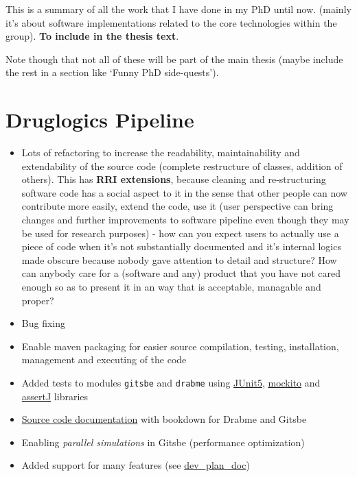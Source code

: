 \documentclass[
  12pt,
]{book}
\providecommand{\tightlist}{%
  \setlength{\itemsep}{0pt}\setlength{\parskip}{0pt}}
\begin{document}
This is a summary of all the work that I have done in my PhD until now.
(mainly it's about software implementations related to the core technologies
within the group). \textbf{To include in the thesis text}.

Note though that not all of these will be part of the main thesis (maybe include the
rest in a section like `Funny PhD side-quests').

\hypertarget{druglogics-pipeline}{%
\section*{Druglogics Pipeline}\label{druglogics-pipeline}}

\begin{itemize}
\tightlist
\item
  Lots of refactoring to increase the readability, maintainability and
  extendability of the source code (complete restructure of classes, addition of
  others).
  This has \textbf{RRI extensions}, because cleaning and re-structuring software code has a social aspect to it in the sense that other people can now contribute more easily, extend the code, use it (user perspective can bring changes and further improvements to software pipeline even though they may be used for research purposes) - how can you expect users to actually use a piece of code when it's not substantially documented and it's internal logics made obscure because nobody gave attention to detail and structure? How can anybody care for a (software and any) product that you have not cared enough so as to present it in an way that is acceptable, managable and proper?
\item
  Bug fixing
\item
  Enable maven packaging for easier source compilation, testing,
  installation, management and executing of the code
\item
  Added tests to modules \texttt{gitsbe} and \texttt{drabme} using \href{https://junit.org/junit5/}{JUnit5}, \href{https://site.mockito.org/}{mockito} and \href{https://assertj.github.io/doc/}{assertJ} libraries
\item
  \href{https://druglogics.github.io/druglogics-doc/}{Source code documentation} with bookdown for Drabme and Gitsbe
\item
  Enabling \emph{parallel simulations} in Gitsbe (performance optimization)
\item
  Added support for many features (see \href{http://tiny.cc/DLDevPlan}{dev\_plan\_doc})

\end{itemize}
\end{document}
